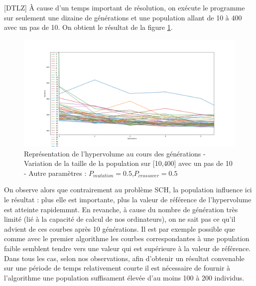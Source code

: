 \documentclass[12pt]{report}
\begin{document}
[DTLZ]
      À cause d'un temps important de résolution, on exécute le programme sur seulement une dizaine de générations et une population allant de 10 à 400 avec un pas de 10.
      On obtient le résultat de la figure \ref{DTLZ7_pop}.
      \begin{figure}[h]
        \centering
        \includegraphics[width=15cm]{img/DTLZ7_pop.png}
        \caption{Représentation de l'hypervolume au cours des générations - Variation de la taille de la population sur [10,400] avec un pas de 10 - Autre paramètres : $P_{mutation} = 0.5$,$P_{crossover} = 0.5$}
        \label{DTLZ7_pop}
      \end{figure}

      On observe alors que contrairement au problème SCH, la population influence ici le résultat : plus elle est importante, plus la valeur de référence de l'hypervolume est atteinte rapidemmnt. En revanche, à cause du nombre de génération très limité (lié à la capacité de calcul de nos ordinateurs), on ne sait pas ce qu'il advient de ces courbes après 10 générations. Il est par exemple possible que comme avec le premier algorithme les courbes correspondantes à une population faible semblent tendre vers une valeur qui est supérieure à la valeur de référence.
      Dans tous les cas, selon nos observations, afin d'obtenir un résultat convenable sur une période de temps relativement courte il est nécessaire de fournir à l'algorithme une population suffisament élevée d'au moins 100 à 200 individus.
\end{document}
